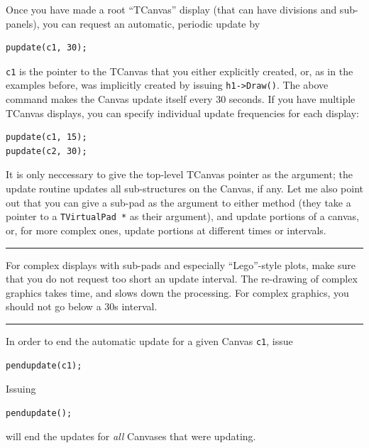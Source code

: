 \documentclass{article}[11pt]
\newcommand{\pointout}[1]{
\vskip 3mm
\begin{minipage}[c]{\linewidth}
\hrule
\vskip 2mm
\begin{minipage}[c]{0.1\linewidth}
{\Huge\color{red}\ding{43}}
\end{minipage}
\begin{minipage}[c]{0.9\linewidth}
#1
\end{minipage}
\vskip 2mm
\hrule
\end{minipage}
\vskip 3mm
}
\begin{document}
Once you have made a root ``TCanvas'' display (that can have divisions
and sub-panels), you can request an automatic, periodic update by

\begin{verbatim}
pupdate(c1, 30);
\end{verbatim}

\verb|c1| is the pointer to the TCanvas that you either explicitly
created, or, as in the examples before, was implicitly created by
issuing \verb|h1->Draw()|. The above command makes the Canvas update
itself every 30 seconds. If you have multiple TCanvas displays, you can
specify individual update frequencies for each display:

\begin{verbatim}
pupdate(c1, 15);
pupdate(c2, 30);
\end{verbatim}

It is only neccessary to give the top-level TCanvas pointer as the
argument; the update routine updates all sub-structures on the Canvas,
if any. Let me also point out that you can give a sub-pad as the
argument to either method (they take a pointer to a
\verb|TVirtualPad *| as their argument), and update portions of a
canvas, or, for more complex ones, update portions at different
times or intervals.

\pointout{For complex displays with sub-pads and especially
  ``Lego''-style plots, make sure that you do not request too short an
  update interval. The re-drawing of complex graphics takes time, and
  slows down the processing. For complex graphics, you should not go
  below a 30s interval.
}

In order to end the automatic update for a given Canvas \verb|c1|, issue

\begin{verbatim}
pendupdate(c1);
\end{verbatim}

Issuing

\begin{verbatim}
pendupdate();
\end{verbatim}

will end the updates for \emph{all} Canvases that were updating.


\end{document}
